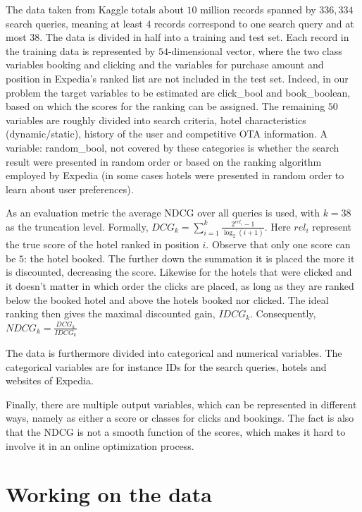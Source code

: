 \documentclass{llncs}
\begin{document}
The data taken from Kaggle totals about $10$ million records spanned by $336,334$ search queries, meaning at least $4$ records correspond to one search query and at most $38$. The data is divided in half into a training and test set. Each record in the training data is represented by $54$-dimensional vector, where the two class variables booking and clicking and the variables for purchase amount and position in Expedia's ranked list are not included in the test set. Indeed, in our problem the target variables to be estimated are click\_bool and book\_boolean, based on which the scores for the ranking can be assigned. The remaining $50$ variables are roughly divided into search criteria, hotel characteristics (dynamic/static), history of the user and competitive OTA information. A variable: random\_bool, not covered by these categories is whether the search result were presented in random order or based on the ranking algorithm employed by Expedia (in some cases hotels were presented in random order to learn about user preferences).

As an evaluation metric the average NDCG over all queries is used, with $k=38$ as the truncation level. Formally, $\displaystyle DCG_{k}=\sum_{i=1}^{k}\frac{2^{rel_i}-1}{\log_{2}(i+1)}$. Here $rel_{i}$ represent the true score of the hotel ranked in position $i$. Observe that only one score can be $5$: the hotel booked. The further down the summation it is placed the more it is discounted, decreasing the score. Likewise for the hotels that were clicked and it doesn't matter in which order the clicks are placed, as long as they are ranked below the booked hotel and above the hotels booked nor clicked. The ideal ranking then gives the maximal discounted gain, $IDCG_{k}$. Consequently, $NDCG_{k}=\frac{DCG_{k}}{IDCG_{k}}$ 

The data is furthermore divided into categorical and numerical variables. The categorical variables are for instance IDs for the search queries, hotels and websites of Expedia.  

Finally, there are multiple output variables, which can be represented in different ways, namely as either a score or classes for clicks and bookings. The fact is also that the NDCG is not a smooth function of the scores, which makes it hard to involve it in an online optimization process.        


\section{Working on the data}
\end{document}

